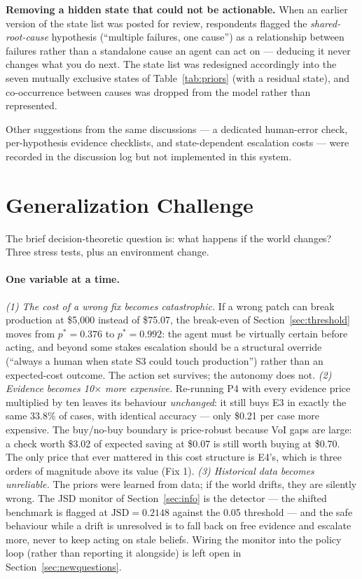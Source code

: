 \documentclass{article}
\begin{document}
\textbf{Removing a hidden state that could not be actionable.} When an earlier version of the state list was posted for review, respondents flagged the \emph{shared-root-cause} hypothesis (``multiple failures, one cause'') as a relationship between failures rather than a standalone cause an agent can act on --- deducing it never changes what you do next. The state list was redesigned accordingly into the seven mutually exclusive states of Table~\ref{tab:priors} (with a residual state), and co-occurrence between causes was dropped from the model rather than represented.

Other suggestions from the same discussions --- a dedicated human-error check, per-hypothesis evidence checklists, and state-dependent escalation costs --- were recorded in the discussion log but not implemented in this system.

\section{Generalization Challenge}
\label{sec:generalization}

The brief decision-theoretic question is: what happens if the world changes? Three stress tests, plus an environment change.

\paragraph{One variable at a time.}
\emph{(1) The cost of a wrong fix becomes catastrophic.} If a wrong patch can break production at \$5{,}000 instead of \$75.07, the break-even of Section~\ref{sec:threshold} moves from $p^* = 0.376$ to $p^* = 0.992$: the agent must be virtually certain before acting, and beyond some stakes escalation should be a structural override (``always a human when state S3 could touch production'') rather than an expected-cost outcome. The action set survives; the autonomy does not.
\emph{(2) Evidence becomes 10$\times$ more expensive.} Re-running P4 with every evidence price multiplied by ten leaves its behaviour \emph{unchanged}: it still buys E3 in exactly the same 33.8\% of cases, with identical accuracy --- only \$0.21 per case more expensive. The buy/no-buy boundary is price-robust because VoI gaps are large: a check worth \$3.02 of expected saving at \$0.07 is still worth buying at \$0.70. The only price that ever mattered in this cost structure is E4's, which is three orders of magnitude above its value (Fix 1).
\emph{(3) Historical data becomes unreliable.} The priors were learned from data; if the world drifts, they are silently wrong. The JSD monitor of Section~\ref{sec:info} is the detector --- the shifted benchmark is flagged at $\mathrm{JSD} = 0.2148$ against the 0.05 threshold --- and the safe behaviour while a drift is unresolved is to fall back on free evidence and escalate more, never to keep acting on stale beliefs. Wiring the monitor into the policy loop (rather than reporting it alongside) is left open in Section~\ref{sec:newquestions}.
\end{document}
